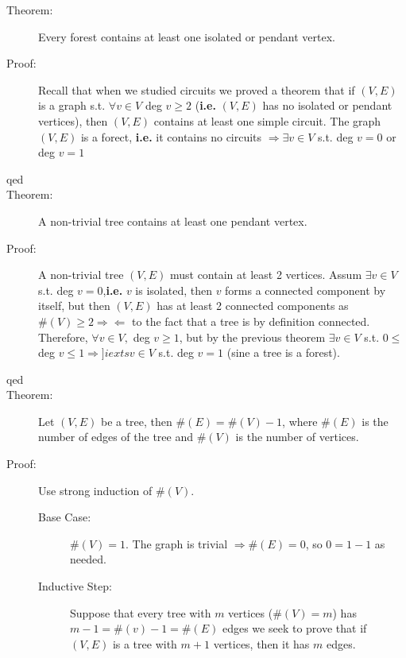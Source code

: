 \documentclass[10pt]{article}
\begin{document}
\begin{description}
\begin{enumerate}
\begin{figure}[h!]
			\end{figure}
		\end{enumerate}
		\item[Theorem:] Every forest contains at least one isolated or pendant vertex.
		\item[Proof:] Recall that when we studied circuits we proved a theorem that if $(V, E)$ is a graph s.t. $\forall v \in V$ deg $v \geq 2$ (\textbf{i.e.} $(V, E)$ has no isolated or pendant vertices), then $(V, E)$ contains at least one simple circuit. The graph $(V, E)$ is a forect, \textbf{i.e.} it contains no circuits $\Rightarrow \exists v \in V$ s.t. deg $v = 0$ or deg $v = 1$
		\item[qed]
		\item[Theorem:] A non-trivial tree contains at least one pendant vertex.
		\item[Proof:] A non-trivial tree $(V, E)$ must contain at least 2 vertices. Assum $\exists v \in V$ s.t. deg $v = 0$,\textbf{i.e.} $v$ is isolated, then $v$ forms a connected component by itself, but then $(V, E)$ has at least 2 connected components as $\#(V) \geq 2 \Rightarrow \Leftarrow$ to the fact that a tree is by definition connected. Therefore, $\forall v \in V,$ deg $v \geq 1$, but by the previous theorem $\exists v \in V$ s.t. $0 \leq$ deg $v \leq 1 \Rightarrow ]iexts v \in V$ s.t. deg $v = 1$ (sine a tree is a forest).
		\item[qed]
		\item[Theorem:] Let $(V, E)$ be a tree, then $\# (E) = \# (V) - 1$, where $\#(E)$ is the number of edges of the tree and $\#(V)$ is the number of vertices.
		\item[Proof:] Use strong induction of $\#(V)$.
		\begin{description}
			\item[Base Case:] $\#(V) = 1$. The graph is trivial $\Rightarrow \#(E) = 0$, so $0 = 1-1$ as needed.
			\item[Inductive Step:] Suppose that every tree with $m$ vertices ($\# (V) = m$) has $m-1 = \#(v) -1 = \#(E)$ edges we seek to prove that if $(V, E)$ is a tree with $m+1$ vertices, then it has $m$ edges. \\

\end{description}
\end{description}
\end{document}

